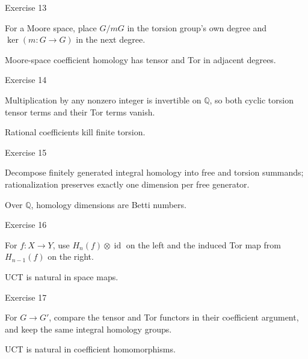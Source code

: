 \begin{exercise}\label{exr:viii26-13}
Exercise 13
\end{exercise}
\begin{hint}
For a Moore space, place \(G/mG\) in the torsion group's own degree and \(\ker(m:G\to G)\) in the next degree.
\end{hint}
\begin{solution}
Moore-space coefficient homology has tensor and Tor in adjacent degrees.
\end{solution}

\begin{exercise}\label{exr:viii26-14}
Exercise 14
\end{exercise}
\begin{hint}
Multiplication by any nonzero integer is invertible on \(\mathbb Q\), so both cyclic torsion tensor terms and their Tor terms vanish.
\end{hint}
\begin{solution}
Rational coefficients kill finite torsion.
\end{solution}

\begin{exercise}\label{exr:viii26-15}
Exercise 15
\end{exercise}
\begin{hint}
Decompose finitely generated integral homology into free and torsion summands; rationalization preserves exactly one dimension per free generator.
\end{hint}
\begin{solution}
Over \(\mathbb Q\), homology dimensions are Betti numbers.
\end{solution}

\begin{exercise}\label{exr:viii26-16}
Exercise 16
\end{exercise}
\begin{hint}
For \(f:X\to Y\), use \(H_n(f)\otimes\operatorname{id}\) on the left and the induced Tor map from \(H_{n-1}(f)\) on the right.
\end{hint}
\begin{solution}
UCT is natural in space maps.
\end{solution}

\begin{exercise}\label{exr:viii26-17}
Exercise 17
\end{exercise}
\begin{hint}
For \(G\to G'\), compare the tensor and Tor functors in their coefficient argument, and keep the same integral homology groups.
\end{hint}
\begin{solution}
UCT is natural in coefficient homomorphisms.
\end{solution}

